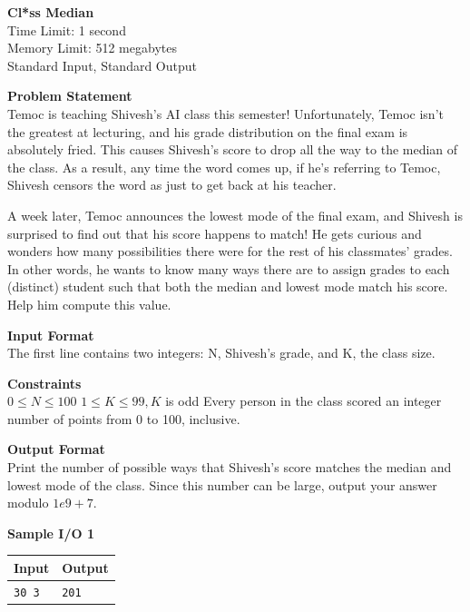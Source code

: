 \documentclass{article}
\begin{document}
\begin{center}
{\LARGE \bf Cl*ss Median}\\
{\large Time Limit: 1 second}\\
{\large Memory Limit: 512 megabytes}\\
Standard Input, Standard Output
\end{center}

{\noindent \bf Problem Statement}\\
Temoc is teaching Shivesh's AI class this semester! Unfortunately, Temoc isn't the greatest at lecturing, and his grade distribution on the final exam is absolutely fried. This causes Shivesh's score to drop all the way to the median of the class. As a result, any time the word  comes up, if he's referring to Temoc, Shivesh censors the word as  just to get back at his teacher. \newline

\noindent A week later, Temoc announces the lowest mode of the final exam, and Shivesh is surprised to find out that his score happens to match! He gets curious and wonders how many possibilities there were for the rest of his classmates' grades. In other words, he wants to know many ways there are to assign grades to each (distinct) student such that both the median and lowest mode match his score. Help him compute this value. \newline

{\noindent \bf Input Format}\\
The first line contains two integers: N, Shivesh's grade, and K, the class size. \newline

{\noindent \bf Constraints}\\
$0 \leq N \leq 100$ \newline
$1 \leq K \leq 99, K$ is odd \newline
Every person in the class scored an integer number of points from 0 to 100, inclusive. \newline

{\noindent \bf Output Format}\\
Print the number of possible ways that Shivesh's score matches the median and lowest mode of the class. Since this number can be large, output your answer modulo $1e9 + 7$. \newline

{\pagebreak \noindent \bf Sample I/O 1}\\
\begin{tabular}{|p{}|p{}|}
    \hline
    \textbf{Input} & \textbf{Output}\\
    \hline
    \texttt{30 3}
    &
    \texttt{201}\\
    \hline
\end{tabular} \newline \newline
\end{document}
